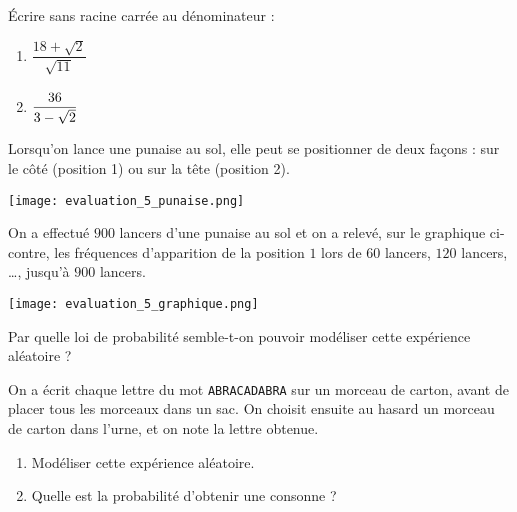 \documentclass[a4paper,dvipsnames]{article}
\begin{document}
\bigskip

\exo[2 points]\vspace{-2mm} Écrire sans racine carrée au dénominateur :
\begin{multicols}{2}
  \begin{enumerate}
    \item $\dfrac{18+\sqrt{2}}{\sqrt{11}}$
    \item $\dfrac{36}{3-\sqrt{2}}\vphantom{\dfrac{\sqrt{2}}{\sqrt{11}}}$
  \end{enumerate}
\end{multicols}
  \dotfill{}

\bigskip

\exo[1 point]\vspace{-2mm} 
\vspace*{-5mm}
\begin{multicols}{2}
  Lorsqu'on lance une punaise au sol, elle peut se positionner de deux façons : sur le côté (position 1) ou sur la tête (position 2).

  \begin{center}
    \texttt{[image: evaluation\_5\_punaise.png]}
  \end{center}

  On a effectué $900$ lancers d'une punaise au sol et on a relevé, sur le graphique ci-contre, les fréquences d'apparition de la position $1$ lors de $60$ lancers, $120$ lancers, \dots, jusqu'à $900$ lancers.

  \begin{center}
    \texttt{[image: evaluation\_5\_graphique.png]}
  \end{center}
\end{multicols}
  Par quelle loi de probabilité semble-t-on pouvoir modéliser cette expérience aléatoire ?

\bigskip

\exo[2 points]\vspace{-2mm} On a écrit chaque lettre du mot \verb|ABRACADABRA| sur un morceau de carton, avant de placer tous les morceaux dans un sac. On choisit ensuite au hasard un morceau de carton dans l'urne, et on note la lettre obtenue.
\begin{enumerate}
  \item Modéliser cette expérience aléatoire.
  \item Quelle est la probabilité d'obtenir une consonne ?
\end{enumerate}

\bigskip
\end{document}

